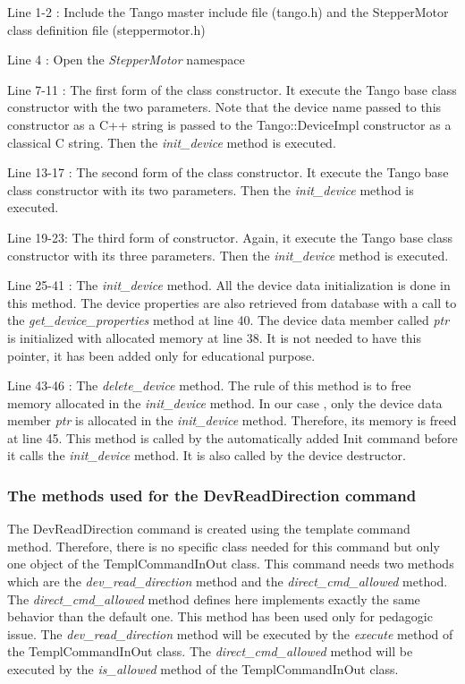 Line 1-2 : Include the Tango master include file (tango.h) and the
StepperMotor class definition file (steppermotor.h)

Line 4 : Open the \emph{StepperMotor} namespace

Line 7-11 : The first form of the class constructor. It execute the
Tango base class constructor with the two parameters. Note that the
device name passed to this constructor as a C++ string is passed to
the Tango::DeviceImpl constructor as a classical
C string. Then the \emph{init\_device} method
is executed.

Line 13-17 : The second form of the class constructor. It execute
the Tango base class constructor with its two parameters. Then the
\emph{init\_device} method is executed.

Line 19-23: The third form of constructor. Again, it execute the Tango
base class constructor with its three parameters. Then the \emph{init\_device}
method is executed.

Line 25-41 : The \emph{init\_device} method. All
the device data initialization is done in this method. The device
properties are also retrieved from database with a call to the \emph{get\_device\_properties}
method at line 40. The device data member called \emph{ptr} is initialized
with allocated memory at line 38. It is not needed to have this pointer,
it has been added only for educational purpose.

Line 43-46 : The \emph{delete\_device} method.
The rule of this method is to free memory allocated in the \emph{init\_device}
method. In our case , only the device data member \emph{ptr} is allocated
in the \emph{init\_device} method. Therefore, its memory is freed
at line 45. This method is called by the automatically added Init
command before it calls the \emph{init\_device} method. It is also
called by the device destructor.


\subsubsection{The methods used for the DevReadDirection command}

The DevReadDirection command is created using the template command
method. Therefore, there is no specific class needed for this command
but only one object of the TemplCommandInOut class. This command needs
two methods which are the \emph{dev\_read\_direction} method and the
\emph{direct\_cmd\_allowed} method. The \emph{direct\_cmd\_allowed}
method defines here implements exactly the same behavior than the
default one. This method has been used only for pedagogic issue. The
\emph{dev\_read\_direction} method will be executed by the \emph{execute}
method of the TemplCommandInOut class. The
\emph{direct\_cmd\_allowed} method will be executed by the \emph{is\_allowed}
method of the TemplCommandInOut class.

